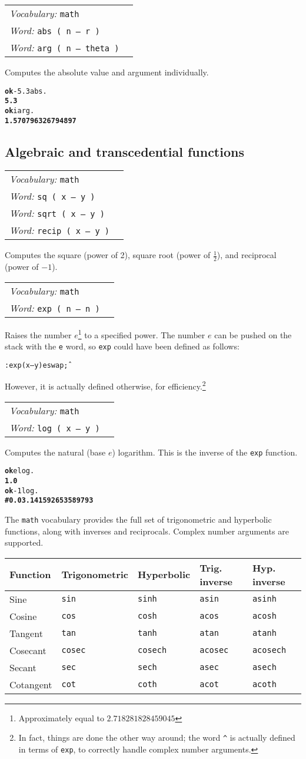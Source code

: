 \documentclass{book}
\newcommand{\tto}{\symbol{123}}
\newcommand{\ttc}{\symbol{125}}
\newcommand{\vocabulary}[1]{\emph{Vocabulary:} \texttt{#1}&\\}
\newcommand{\ordinaryword}[2]{\index{\texttt{#1}}\emph{Word:} \texttt{#2}&\\}
\newcommand{\wordtable}[1]{

\begin{tabularx}{12cm}[t]{lX}
\hline
#1
\hline
\end{tabularx}

}
\begin{document}
\wordtable{
\vocabulary{math}
\ordinaryword{abs}{abs ( n -- r )}
\ordinaryword{arg}{arg ( n -- theta )}

}
Computes the absolute value and argument individually.
\begin{alltt}
\textbf{ok} -5.3 abs .
\textbf{5.3}
\textbf{ok} i arg .
\textbf{1.570796326794897}
\end{alltt}

\subsection{Algebraic and transcedential functions}

\wordtable{
\vocabulary{math}
\ordinaryword{sq}{sq ( x -- y )}
\ordinaryword{sqrt}{sqrt ( x -- y )}
\ordinaryword{recip}{recip ( x -- y )}
}
Computes the square (power of 2), square root (power of $\frac{1}{2}$), and reciprocal (power of $-1$).
\wordtable{
\vocabulary{math}
\ordinaryword{exp}{exp ( n -- n )}
}
Raises the number $e$\footnote{Approximately equal to $2.718281828459045$} to a specified power. The number $e$ can be pushed on the stack with the \texttt{e} word, so \texttt{exp} could have been defined as follows:

\begin{alltt}
: exp ( x -- y ) e swap \^ ;
\end{alltt}

However, it is actually defined otherwise, for efficiency.\footnote{In fact, things are done the other way around; the word \texttt{\^{}} is actually defined in terms of \texttt{exp}, to correctly handle complex number arguments.}
\wordtable{
\vocabulary{math}
\ordinaryword{log}{log ( x -- y )}
}
Computes the natural (base $e$) logarithm. This is the inverse of the \texttt{exp} function.
\begin{alltt}
\textbf{ok} e log .
\textbf{1.0}
\textbf{ok} -1 log .
\textbf{\#\tto 0.0 3.141592653589793 \ttc}
\end{alltt}
The \texttt{math} vocabulary provides the full set of trigonometric and hyperbolic functions, along with inverses and reciprocals. Complex number arguments are supported.

\begin{tabular}{l|l|l|l|l}
Function&Trigonometric&Hyperbolic&Trig. inverse&Hyp. inverse\\
\hline
Sine&\texttt{sin}&\texttt{sinh}&\texttt{asin}&\texttt{asinh}\\
Cosine&\texttt{cos}&\texttt{cosh}&\texttt{acos}&\texttt{acosh}\\
Tangent&\texttt{tan}&\texttt{tanh}&\texttt{atan}&\texttt{atanh}\\
\hline
Cosecant&\texttt{cosec}&\texttt{cosech}&\texttt{acosec}&\texttt{acosech}\\
Secant&\texttt{sec}&\texttt{sech}&\texttt{asec}&\texttt{asech}\\
Cotangent&\texttt{cot}&\texttt{coth}&\texttt{acot}&\texttt{acoth}
\end{tabular}
\end{document}
